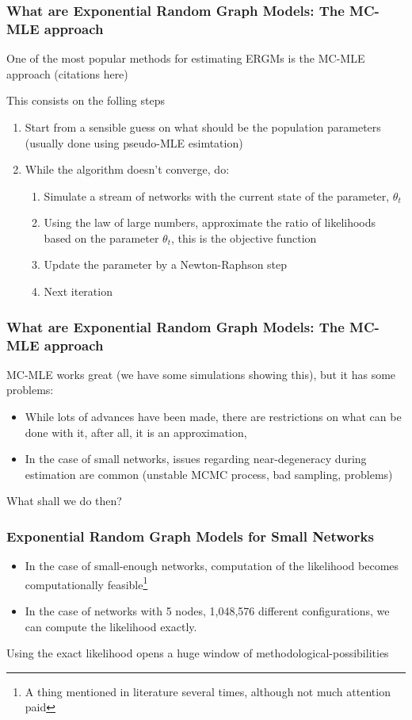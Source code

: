 \documentclass{beamer}
\begin{document}
\begin{frame}
\frametitle{What are Exponential Random Graph Models: The MC-MLE approach}

One of the most popular methods for estimating ERGMs is the MC-MLE approach (citations here)

This consists on the folling steps

\begin{enumerate}
\item Start from a sensible guess on what should be the population parameters
(usually done using pseudo-MLE esimtation)
\item While the algorithm doesn't converge, do:
  \begin{enumerate}
  \item Simulate a stream of networks with the current state of the parameter,
  $\theta_t$
  \item Using the law of large numbers, approximate the ratio of likelihoods 
  based on the parameter $\theta_t$, this is the objective function
  \item Update the parameter by a Newton-Raphson step
  \item Next iteration
  \end{enumerate}
\end{enumerate}

\end{frame}

\begin{frame}
\frametitle{What are Exponential Random Graph Models: The MC-MLE approach}

MC-MLE works great (we have some simulations showing this), but it has some
problems:

\begin{itemize}
\item While lots of advances have been made, there are restrictions on what can
be done with it, after all, it is an approximation,
\item In the case of small networks, issues regarding near-degeneracy during
estimation are common (unstable MCMC process, bad sampling, problems)
\end{itemize}

What shall we do then?

\end{frame}

\begin{frame}
\frametitle{Exponential Random Graph Models for Small Networks}

\begin{itemize}
\item In the case of small-enough networks, computation of the likelihood becomes
computationally feasible\footnote{A thing mentioned in literature several times, although not much attention paid}
\item In the case of networks with 5 nodes, 1,048,576
different configurations, we can compute the likelihood exactly.
\end{itemize}

Using the exact likelihood opens a huge window of methodological-possibilities
\end{frame}
\end{document}
